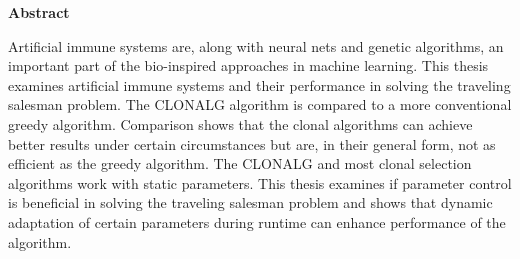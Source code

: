%
%
% 
% 
% 



\cleardoublepage


\begin{center}
{\Large\bfseries Abstract}
\end{center}
Artificial immune systems are, along with neural nets and genetic algorithms, an important part of the bio-inspired approaches in machine learning. This thesis examines artificial immune systems and their performance in solving the traveling salesman problem. The CLONALG algorithm is compared to a more conventional greedy algorithm. Comparison shows that the clonal algorithms can achieve better results under certain circumstances but are, in their general form, not as efficient as the greedy algorithm. The CLONALG and most clonal selection algorithms work with static parameters. This thesis examines if parameter control is beneficial in solving the traveling salesman problem and shows that dynamic adaptation of certain parameters during runtime can enhance performance of the algorithm. 

